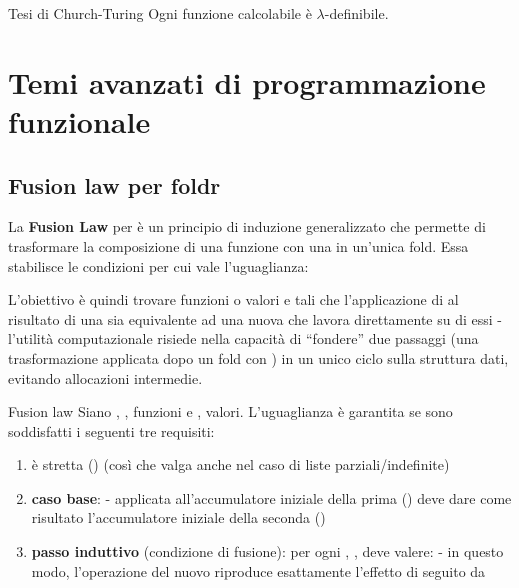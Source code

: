 \documentclass[a4paper,11pt]{report}
\begin{document}
\begin{thmframe}{Tesi di Church-Turing}{}
 Ogni funzione calcolabile è $\lambda$-definibile.
\end{thmframe}


\chapter{Temi avanzati di programmazione funzionale}

\section{Fusion law per foldr}

La \textbf{Fusion Law} per  è un principio di induzione generalizzato che permette di trasformare la composizione di una funzione con una  in un'unica fold. Essa stabilisce le condizioni per cui vale l'uguaglianza:


L'obiettivo è quindi trovare funzioni o valori  e  tali che l'applicazione di  al risultato di una  sia equivalente ad una nuova  che lavora direttamente su di essi - l'utilità computazionale risiede nella capacità di ``fondere'' due passaggi (una trasformazione  applicata dopo un fold con ) in un unico ciclo sulla struttura dati, evitando allocazioni intermedie.

\begin{thmframe}{Fusion law}{}
    Siano , ,  funzioni e ,  valori. L'uguaglianza  è garantita se sono soddisfatti i seguenti tre requisiti:
    \begin{enumerate}
        \item {} è stretta () (così che valga anche nel caso di liste parziali/indefinite)
        \item \textbf{caso base}:  -  applicata all'accumulatore iniziale della prima  () deve dare come risultato l'accumulatore iniziale della seconda ()
        \item \textbf{passo induttivo} (condizione di fusione): per ogni , , deve valere: 
            \subitem {} - in questo modo, l'operazione  del nuovo  riproduce esattamente l'effetto di  seguito da 
    \end{enumerate}

\end{thmframe}
\end{document}
